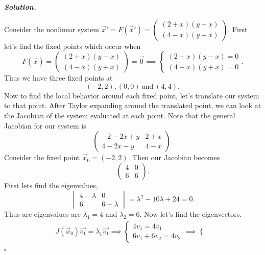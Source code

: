 \documentclass[12pt]{report}
\newenvironment{solution}[1][\it{Solution}]{\textbf{#1. } }{$\square$}
\begin{document}
\begin{solution}

    \noindent
    Consider the nonlinear system $\vec{x}' = F(\vec{x}') = \begin{pmatrix}
        (2 + x)(y - x)\\
        (4 - x)(y + x)
    \end{pmatrix}.$ First let's find the fixed points which occur when
    \[
        F(\vec{x}) = \begin{pmatrix}
            (2 + x)(y - x)\\
            (4 - x)(y + x)
        \end{pmatrix} = \vec{0} \implies \begin{cases}
            (2 + x)(y - x) = 0\\
            (4 - x)(y + x) = 0
        \end{cases}.
    \]
    Thus we have three fixed points at
    \[ 
        (-2,2), (0,0) ~\text{and}~ (4,4).
    \]
    Now to find the local behavior around each fixed point, let's translate our system to that point. After Taylor expanding around the translated point, we can look at the Jacobian of the system evaluated at each point. Note that the general Jacobian for our system is
    \[ 
        \begin{pmatrix}
            -2-2x+y & 2 + x\\
            4 - 2x - y &  4 - x
        \end{pmatrix}.
    \]
    Consider the fixed point $\vec{x}_0 = (-2,2)$. Then our Jacobian becomes
    \[ 
        \begin{pmatrix}
            4 & 0 \\
            6 & 6  
        \end{pmatrix}.
    \]
    First lets find the eigenvalues,
    \[ 
        \begin{vmatrix}
            4 - \lambda & 0 \\
            6 & 6 - \lambda 
        \end{vmatrix} = \lambda^2 - 10\lambda + 24 = 0.
    \]
    Thus are eigenvalues are $\lambda_1 = 4$ and $\lambda_2 = 6$. Now let's find the eigenvectors.
    \begin{align*}
        J(\vec{x}_0)\vec{v_1} = \lambda_1 \vec{v_1} \implies \begin{cases}
            4v_1 = 4v_1\\
            6v_1 + 6v_2 = 4v_2
        \end{cases} \implies
        \begin{cases}

\end{cases}
\end{align*}
\end{solution}
\end{document}
